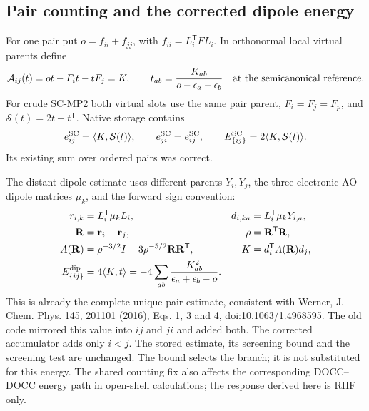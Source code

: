 \documentclass[11pt]{article}
\newcommand{\T}{^{\mathsf T}}
\newcommand{\ip}[2]{\langle #1,#2\rangle}
\begin{document}
\subsection{Pair counting and the corrected dipole energy}
For one pair put $o=f_{ii}+f_{jj}$, with $f_{ii}=L_i\T F L_i$.
In orthonormal local virtual parents define
\begin{equation}
 \mathcal A_{ij}(t)=o t-F_i t-t F_j=K,\qquad
 t_{ab}=\frac{K_{ab}}{o-\epsilon_a-\epsilon_b}
 \quad\hbox{at the semicanonical reference}.
 \label{eq:gradient-screened-amplitudes}
\end{equation}
For crude SC-MP2 both virtual slots use the same pair parent,
$F_i=F_j=F_p$, and $\mathcal S(t)=2t-t\T$. Native storage contains
\begin{equation}
 e_{ij}^{\rm SC}=\ip K{\mathcal S(t)},\qquad
 e_{ji}^{\rm SC}=e_{ij}^{\rm SC},\qquad
 E_{\{ij\}}^{\rm SC}=2\ip K{\mathcal S(t)}.
 \label{eq:gradient-sc-counting}
\end{equation}
Its existing sum over ordered pairs was correct.

The distant dipole estimate uses different parents $Y_i,Y_j$, the three
electronic AO dipole matrices $\mu_k$, and the forward sign convention:
\begin{align}
 r_{i,k}&=L_i\T\mu_k L_i,& d_{i,ka}&=L_i\T\mu_k Y_{i,a},\\
 \mathbf R&=\mathbf r_i-\mathbf r_j,& \rho&=\mathbf R\T\mathbf R,\\
 A(\mathbf R)&=\rho^{-3/2}I-3\rho^{-5/2}\mathbf R\mathbf R\T,&
 K&=d_i\T A(\mathbf R)d_j,\\
 E_{\{ij\}}^{\rm dip}&=4\ip Kt
 =-4\sum_{ab}\frac{K_{ab}^2}{\epsilon_a+\epsilon_b-o}.&&
 \label{eq:gradient-dipole-counting}
\end{align}
This is already the complete unique-pair estimate, consistent with Werner,
J. Chem. Phys. 145, 201101 (2016), Eqs. 1, 3 and 4,
doi:10.1063/1.4968595. The old code mirrored this value into $ij$ and $ji$
and added both. The corrected accumulator adds only $i<j$. The stored
estimate, its screening bound and the screening test are unchanged.
The bound selects the branch; it is not substituted for this energy.
The shared counting fix also affects the corresponding DOCC--DOCC energy
path in open-shell calculations; the response derived here is RHF only.
\end{document}
